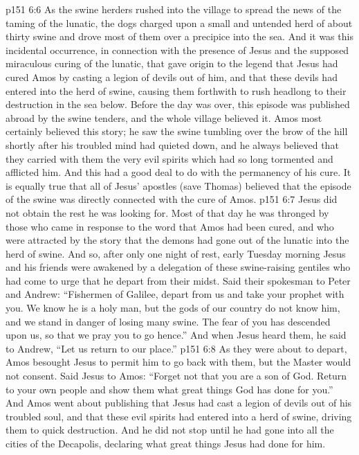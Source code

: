 \vs p151 6:6 As the swine herders rushed into the village to spread the news of the taming of the lunatic, the dogs charged upon a small and untended herd of about thirty swine and drove most of them over a precipice into the sea. And it was this incidental occurrence, in connection with the presence of Jesus and the supposed miraculous curing of the lunatic, that gave origin to the legend that Jesus had cured Amos by casting a legion of devils out of him, and that these devils had entered into the herd of swine, causing them forthwith to rush headlong to their destruction in the sea below. Before the day was over, this episode was published abroad by the swine tenders, and the whole village believed it. Amos most certainly believed this story; he saw the swine tumbling over the brow of the hill shortly after his troubled mind had quieted down, and he always believed that they carried with them the very evil spirits which had so long tormented and afflicted him. And this had a good deal to do with the permanency of his cure. It is equally true that all of Jesus’ apostles (save Thomas) believed that the episode of the swine was directly connected with the cure of Amos.
\pc \vs p151 6:7 Jesus did not obtain the rest he was looking for. Most of that day he was thronged by those who came in response to the word that Amos had been cured, and who were attracted by the story that the demons had gone out of the lunatic into the herd of swine. And so, after only one night of rest, early Tuesday morning Jesus and his friends were awakened by a delegation of these swine\hyp{}raising gentiles who had come to urge that he depart from their midst. Said their spokesman to Peter and Andrew: “Fishermen of Galilee, depart from us and take your prophet with you. We know he is a holy man, but the gods of our country do not know him, and we stand in danger of losing many swine. The fear of you has descended upon us, so that we pray you to go hence.” And when Jesus heard them, he said to Andrew, \textcolor{ubdarkred}{“Let us return to our place.”}
\vs p151 6:8 As they were about to depart, Amos besought Jesus to permit him to go back with them, but the Master would not consent. Said Jesus to Amos: \textcolor{ubdarkred}{“Forget not that you are a son of God. Return to your own people and show them what great things God has done for you.”} And Amos went about publishing that Jesus had cast a legion of devils out of his troubled soul, and that these evil spirits had entered into a herd of swine, driving them to quick destruction. And he did not stop until he had gone into all the cities of the Decapolis, declaring what great things Jesus had done for him.
